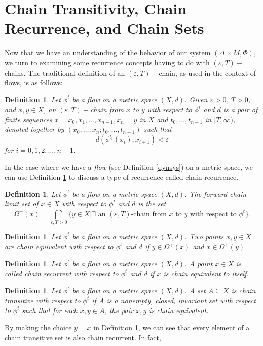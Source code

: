 \documentclass[11pt]{article}
\newtheorem{defn}[thm]{Definition}
\begin{document}
\section{Chain Transitivity, Chain Recurrence, and Chain Sets}
\indent Now that we have an understanding of the behavior of our system $(\Delta\times M, \Phi)$, we turn to examining some recurrence concepts having to do with $(\varepsilon,T)-$chains.  The traditional definition of an $(\varepsilon,T)-$chain, as used in the context of flows, is as follows:
\begin{defn}\label{etchain}
Let $\phi^t$ be a flow on a metric space $(X,d)$.  Given $\varepsilon>0$, $T>0$, and $x,y\in X$, an $(\varepsilon,T)-$chain from $x$ to $y$ with respect to $\phi^t$ and $d$ is a pair of finite sequences $x=x_0,x_1,\ldots,x_{n-1},x_n=y$ in $X$ and $t_0,\ldots,t_{n-1}$ in $[T,\infty)$, denoted together by $(x_0,\ldots,x_n;t_0,\ldots,t_{n-1})$ such that 
$$d(\phi^{t_i}(x_i),x_{i+1})<\varepsilon$$
for $i=0,1,2,\ldots,n-1$.  \cite{Alongi}
\end{defn}  
In the case where we have a \emph{flow} (see Definition \ref{dynsys}) on a metric space, we can use Definition \ref{etchain} to discuss a type of recurrence called chain recurrence.
\begin{defn}
Let $\phi^t$ be a flow on a metric space $(X,d)$.  The forward chain limit set of $x\in X$ with respect to $\phi^t$ and $d$ is the set
$$\Omega^+(x)=\bigcap_{\varepsilon,T>0}\{y\in X | \exists \text{ an }(\varepsilon,T)\text{-chain from }x\text{ to }y\text{ with respect to }\phi^t\}.$$
\end{defn}
\begin{defn}
Let $\phi^t$ be a flow on a metric space $(X,d)$. Two points $x,y\in X$ are chain equivalent with respect to $\phi^t$ and $d$ if $y\in\Omega^+(x)$ and $x\in\Omega^+(y)$. \cite{Alongi}
\end{defn}

\begin{defn}
Let $\phi^t$ be a flow on a metric space $(X,d)$.  A point $x\in X$ is called chain recurrent with respect to $\phi^t$ and $d$ if $x$ is chain equivalent to itself. \cite{Alongi}
\end{defn}

\begin{defn}\label{chaintrans}
Let $\phi^t$ be a flow on a metric space $(X,d)$.  A set $A\subseteq X$ is chain transitive with respect to $\phi^t$ if $A$ is a nonempty, closed, invariant set with respect to $\phi^t$ such that for each $x,y\in A$, the pair $x,y$ is chain equivalent. \cite{Alongi}
\end{defn}
\noindent By making the choice $y=x$ in Definition \ref{chaintrans}, we can see that every element of a chain transitive set is also chain recurrent.  In fact,
\end{document}
